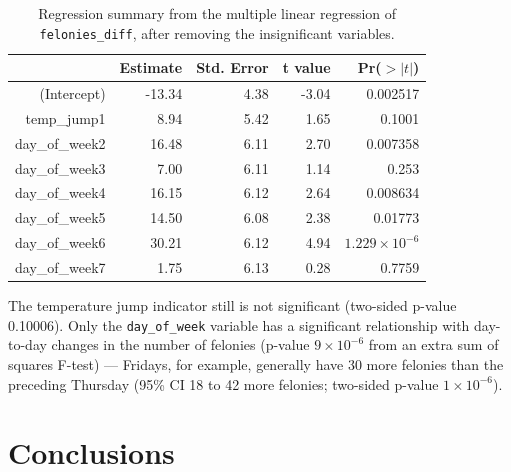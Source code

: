 \documentclass[11pt,notitlepage]{article}
\begin{document}
\begin{table}[ht]
\vspace*{-1mm}
\footnotesize
\centering
\begin{tabular}{rrrrr}
  \hline
 & Estimate & Std. Error & t value & Pr($>|t|$) \\ 
  \hline
(Intercept) & -13.34 & 4.38 & -3.04 & 0.002517 \\ 
  temp\_jump1 & 8.94 & 5.42 & 1.65 & 0.1001 \\ 
  day\_of\_week2 & 16.48 & 6.11 & 2.70 & 0.007358 \\ 
  day\_of\_week3 & 7.00 & 6.11 & 1.14 & 0.253 \\ 
  day\_of\_week4 & 16.15 & 6.12 & 2.64 & 0.008634 \\ 
  day\_of\_week5 & 14.50 & 6.08 & 2.38 & 0.01773 \\ 
  day\_of\_week6 & 30.21 & 6.12 & 4.94 & $1.229 \times 10^{-6}$ \\ 
  day\_of\_week7 & 1.75 & 6.13 & 0.28 & 0.7759 \\ 
   \hline
\end{tabular}
\captionsetup{width=0.9\textwidth}
\vspace*{-2mm}
\caption{Regression summary from the multiple linear regression of \texttt{felonies_diff}, after removing the insignificant variables.}
\label{tab:lmd6}   
\vspace*{-3mm}
\end{table}






The temperature jump indicator still is not significant (two-sided p-value 0.10006). Only the \texttt{day_of_week} variable has a significant relationship with day-to-day changes in the number of felonies (p-value $9 \times 10^{-6}$ from an extra sum of squares F-test) --- Fridays, for example, generally have 30 more felonies than the preceding Thursday (95\% CI 18 to 42 more felonies; two-sided p-value $1 \times 10^{-6}$).


\section{Conclusions}
\label{sec:conclusions}
\end{document}
